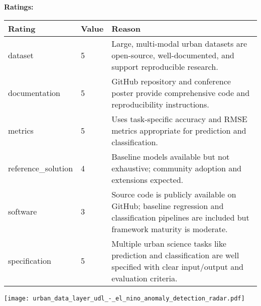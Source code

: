 {{{\bf Ratings:} ~ \\

\begin{tabular}{p{} p{} p{}}
\hline
Rating & Value & Reason \\
\hline
dataset & 5 & Large, multi-modal urban datasets are open-source, well-documented, and support
reproducible research.
 \\
documentation & 5 & GitHub repository and conference poster provide comprehensive code and reproducibility
instructions.
 \\
metrics & 5 & Uses task-specific accuracy and RMSE metrics appropriate for prediction and classification.
 \\
reference\_solution & 4 & Baseline models available but not exhaustive; community adoption and extensions expected.
 \\
software & 3 & Source code is publicly available on GitHub; baseline regression and classification
pipelines are included but framework maturity is moderate.
 \\
specification & 5 & Multiple urban science tasks like prediction and classification are well specified
with clear input/output and evaluation criteria.
 \\
\hline
\end{tabular}

\texttt{[image: urban\_data\_layer\_udl\_-\_el\_nino\_anomaly\_detection\_radar.pdf]}
}}
\clearpage